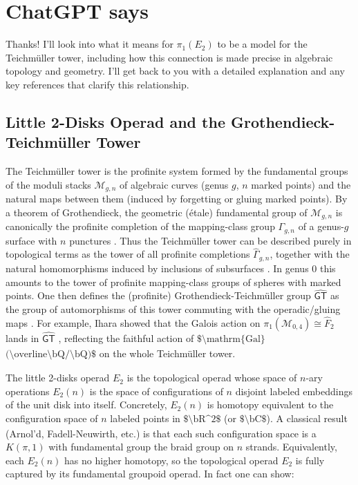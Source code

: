 \section{ChatGPT says}
Thanks! I'll look into what it means for $\pi_1(E_2)$ to be a model for the Teichm\"uller tower, including how this connection is made precise in algebraic topology and geometry.
I'll get back to you with a detailed explanation and any key references that clarify this relationship.


\subsection{Little 2-Disks Operad and the Grothendieck-Teichm\"uller Tower}

The Teichm\"uller tower is the profinite system formed by the fundamental groups of the moduli stacks $\mathcal{M}_{g,n}$ of algebraic curves (genus $g$, $n$ marked points) and the natural maps between them (induced by forgetting or gluing marked points).  By a theorem of Grothendieck, the geometric (\'etale) fundamental group of $\mathcal{M}_{g,n}$ is canonically the profinite completion of the mapping-class group $\Gamma_{g,n}$ of a genus-$g$ surface with $n$ punctures \cite{de_brito_operads_2019}. Thus the Teichm\"uller tower can be described purely in topological terms as the tower of all profinite completions $\widehat\Gamma_{g,n}$, together with the natural homomorphisms induced by inclusions of subsurfaces \cite{borghi_lecture_2025}. In genus 0 this amounts to the tower of profinite mapping-class groups of spheres with marked points.  One then defines the (profinite) Grothendieck-Teichm\"uller group $\widehat{\mathsf{GT}}$ as the group of automorphisms of this tower commuting with the operadic/gluing maps \cite{de_brito_operads_2019}. For example, Ihara showed that the Galois action on $\pi_1(\mathcal{M}_{0,4})\cong\widehat F_2$ lands in $\widehat{\mathsf{GT}}$ \cite{de_brito_operads_2019}, reflecting the faithful action of $\mathrm{Gal}(\overline\bQ/\bQ)$ on the whole Teichm\"uller tower.

The little 2-disks operad $E_2$ is the topological operad whose space of $n$-ary operations $E_2(n)$ is the space of configurations of $n$ disjoint labeled embeddings of the unit disk into itself.  Concretely, $E_2(n)$ is homotopy equivalent to the configuration space of $n$ labeled points in $\bR^2$ (or $\bC$).  A classical result (Arnol'd, Fadell-Neuwirth, etc.) is that each such configuration space is a $K(\pi,1)$ with fundamental group the braid group on $n$ strands.  Equivalently, each $E_2(n)$ has no higher homotopy, so the topological operad $E_2$ is fully captured by its fundamental groupoid operad.  In fact one can show:

